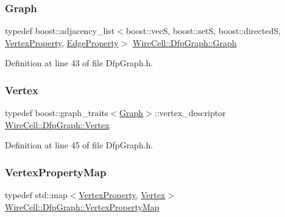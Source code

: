 \subsubsection{\texorpdfstring{Graph}{Graph}}
{\footnotesize\ttfamily typedef boost\+::adjacency\+\_\+list$<$boost\+::vecS, boost\+::setS, boost\+::directedS, \hyperlink{struct_wire_cell_1_1_dfp_graph_1_1_vertex_property}{Vertex\+Property}, \hyperlink{struct_wire_cell_1_1_dfp_graph_1_1_edge_property}{Edge\+Property}$>$ \hyperlink{struct_wire_cell_1_1_dfp_graph_ad5dd2546b355a72f5f24e90a985a45e9}{Wire\+Cell\+::\+Dfp\+Graph\+::\+Graph}}



Definition at line 43 of file Dfp\+Graph.\+h.

\mbox{\label{struct_wire_cell_1_1_dfp_graph_a2f38c4e60540b0b3e530b7b8588f7725}} 
\subsubsection{\texorpdfstring{Vertex}{Vertex}}
{\footnotesize\ttfamily typedef boost\+::graph\+\_\+traits$<$\hyperlink{struct_wire_cell_1_1_dfp_graph_ad5dd2546b355a72f5f24e90a985a45e9}{Graph}$>$\+::vertex\+\_\+descriptor \hyperlink{struct_wire_cell_1_1_dfp_graph_a2f38c4e60540b0b3e530b7b8588f7725}{Wire\+Cell\+::\+Dfp\+Graph\+::\+Vertex}}



Definition at line 45 of file Dfp\+Graph.\+h.

\mbox{\label{struct_wire_cell_1_1_dfp_graph_a3908c3dc81685f845df6243825cc6021}} 
\subsubsection{\texorpdfstring{Vertex\+Property\+Map}{VertexPropertyMap}}
{\footnotesize\ttfamily typedef std\+::map$<$\hyperlink{struct_wire_cell_1_1_dfp_graph_1_1_vertex_property}{Vertex\+Property}, \hyperlink{struct_wire_cell_1_1_dfp_graph_a2f38c4e60540b0b3e530b7b8588f7725}{Vertex}$>$ \hyperlink{struct_wire_cell_1_1_dfp_graph_a3908c3dc81685f845df6243825cc6021}{Wire\+Cell\+::\+Dfp\+Graph\+::\+Vertex\+Property\+Map}}



